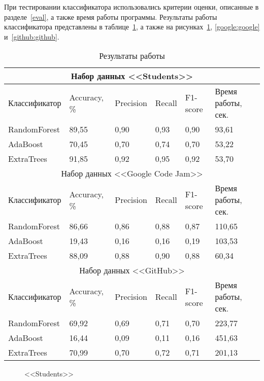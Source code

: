 При тестировании классификатора использовались критерии оценки, описанные в разделе~\ref{eval}, 
а также время работы программы. Результаты работы классификатора представлены в таблице~\ref{tab:results}, а также
на рисунках~\ref{students_res:students_res}, \ref{google:google} и~\ref{github:github}.

\begin{table}[h!]
\caption{ Результаты работы }
\label{tab:results}
\begin{center}
\begin{tabularx}{\linewidth}{|X|X|X|X|X|X|}
\hline
\multicolumn{6}{|c|}{Набор данных <<Students>>} \\
\hline
Классификатор & Accuracy, \% & Precision & Recall & F1-score & Время работы, сек.\\
\hline
RandomForest & 89,55 & 0,90 & 0,93 & 0,90 & 93,61\\
\hline
AdaBoost & 70,45 & 0,70 & 0,74 & 0,70 & 53,22\\
\hline
ExtraTrees & 91,85 & 0,92 & 0,95 & 0,92 & 53,70 \\
\hline
\multicolumn{6}{|c|}{Набор данных <<Google Code Jam>>} \\
\hline
Классификатор & Accuracy, \% & Precision & Recall & F1-score & Время работы, сек.\\
\hline
RandomForest & 86,66 & 0,86 & 0,88 & 0,87 & 110,65\\
\hline
AdaBoost & 19,43 & 0,16 & 0,16 & 0,19 & 103,53\\
\hline
ExtraTrees & 88,09 & 0,88 & 0,90 & 0,88 & 60,34 \\
\hline
\multicolumn{6}{|c|}{Набор данных <<GitHub>>} \\
\hline
Классификатор & Accuracy, \% & Precision & Recall & F1-score & Время работы, сек.\\
\hline
RandomForest & 69,92 & 0,69 & 0,71 & 0,70 & 223,77\\
\hline
AdaBoost & 16,44 & 0,09 & 0,11 & 0,16 & 451,63\\
\hline
ExtraTrees & 70,99 & 0,70 & 0,72 & 0,71 & 201,13 \\
\hline
\end{tabularx}
\end{center}
\end{table}

\begin{figure}[h!]
\caption{ <<Students>> }
\label{students_res:students_res}
\end{figure}

